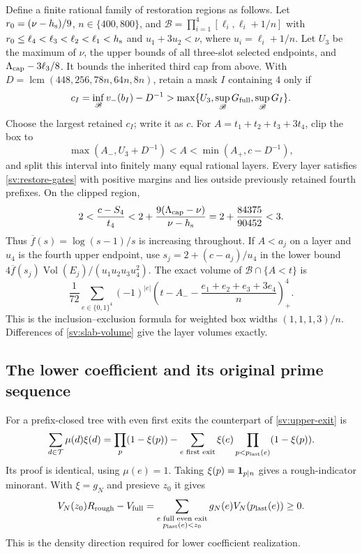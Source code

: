 Define a finite rational family of restoration regions as follows. Let
$r_0=(\nu-{h_{\rm s}})/9$, $n\in\{400,800\}$, and
$\mathscr B=\prod_{i=1}^4[\ell_i,\ell_i+1/n]$ with
$r_0\le\ell_4<\ell_3<\ell_2<\ell_1<{h_{\rm s}}$ and
$u_1+3u_2<\nu$, where $u_i=\ell_i+1/n$.
Let $U_3$ be the maximum of $\nu$, the upper bounds of all
three-slot selected endpoints, and $\Lambda_{\rm cap}-3\ell_3/8$.
It bounds the inherited third cap from above.
With $D=\operatorname{lcm}(448,256,78n,64n,8n)$, retain a mask
$I$ containing $4$ only if
\[
 c_I=\inf_{\mathscr B} v_-(b_I)-D^{-1}
       >\max\{U_3,\sup_{\mathscr B} G_{\rm full},\sup_{\mathscr B} G_I\}.
\]
Choose the largest retained $c_I$; write it as $c$.
For $A=t_1+t_2+t_3+3t_4$, clip the box to
\[
 \max(A_-,U_3+D^{-1})<A<\min(A_+,c-D^{-1}),
\]
and split this interval into finitely many equal rational layers.
Every layer satisfies \eqref{sv:restore-gates} with positive
margins and lies outside previously retained fourth prefixes.
On the clipped region,
\[
 2<\frac{c-S_4}{t_4}
       <2+\frac{9(\Lambda_{\rm cap}-\nu)}{\nu-{h_{\rm s}}}
       =2+\frac{84375}{90452}<3.
\]
Thus $\overline f(s)=\log(s-1)/s$ is increasing throughout.
If $A<a_j$ on a layer and $u_4$ is the fourth upper endpoint, use
$s_j=2+(c-a_j)/u_4$ in the lower bound
$4\overline f(s_j)\operatorname{Vol}(E_j)/(u_1u_2u_3u_4^2)$.
The exact volume of $\mathscr B\cap\{A<t\}$ is
\begin{equation}\label{sv:slab-volume}
 \frac1{72}\sum_{e\in\{0,1\}^4}(-1)^{|e|}
 \left(t-A_--\frac{e_1+e_2+e_3+3e_4}{n}\right)_+^4.
\end{equation}
This is the inclusion--exclusion formula for weighted box widths
$(1,1,1,3)/n$.  Differences of \eqref{sv:slab-volume} give
the layer volumes exactly.

\subsection{The lower coefficient and its original prime sequence}

For a prefix-closed tree with even first exits the counterpart of
\eqref{sv:upper-exit} is
\begin{equation}\label{sv:lower-exit}
 \sum_{d\in\mathcal T}\mu(d)\xi(d)
 =\prod_p(1-\xi(p))
 -\sum_{e\text{ first exit}}\xi(e)
               \prod_{p<p_{\rm last}(e)}(1-\xi(p)).
\end{equation}
Its proof is identical, using $\mu(e)=1$.
Taking $\xi(p)=\mathbf 1_{p\mid n}$ gives a rough-indicator
minorant.  With $\xi=g_N$ and presieve $z_0$ it gives
\begin{equation}\label{sv:lower-projection}
 V_N(z_0)R_{\rm rough}-V_{\rm full}
 =\sum_{\substack{e\text{ full even exit}\\p_{\rm last}(e)<z_0}}
                      g_N(e)V_N(p_{\rm last}(e))\ge0.
\end{equation}
This is the density direction required for lower coefficient realization.

